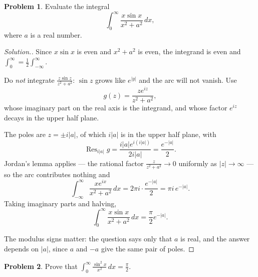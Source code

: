 \documentclass[11pt,a4paper]{article}
\theoremstyle{definition}
\newtheorem{problemx}{Problem}[section]
\newenvironment{problem}{\begin{problemx}}{\end{problemx}}
\newenvironment{solution}
  {\renewcommand{\qedsymbol}{}\begin{proof}[\textit{Solution}.]}
  {\end{proof}}
\begin{document}
\begin{problem}
Evaluate the integral
$$\int^{\infty}_{0}\frac{x \sin x}{x^{2} + a^{2}}\,dx,$$
where $a$ is a real number.
\end{problem}

\begin{solution}
Since $x\sin x$ is even and $x^2+a^2$ is even, the integrand is even and
$\int^{\infty}_{0} = \tfrac12\int^{\infty}_{-\infty}$.

Do \emph{not} integrate $\frac{z\sin z}{z^2+a^2}$: $\sin z$ grows like
$e^{\left|y\right|}$ and the arc will not vanish. Use
$$g(z) = \frac{z e^{iz}}{z^2+a^2},$$
whose imaginary part on the real axis is the integrand, and whose factor $e^{iz}$
decays in the upper half plane.

The poles are $z = \pm i\left|a\right|$, of which $i\left|a\right|$ is in the
upper half plane, with
$$\operatorname{Res}_{i\left|a\right|} g
= \frac{i\left|a\right| e^{i(i\left|a\right|)}}{2i\left|a\right|}
= \frac{e^{-\left|a\right|}}{2}.$$
Jordan's lemma applies --- the rational factor $\frac{z}{z^2+a^2} \rightarrow 0$
uniformly as $\left|z\right| \rightarrow \infty$ --- so the arc contributes
nothing and
$$\int^{\infty}_{-\infty}\frac{x e^{ix}}{x^2+a^2}\,dx
= 2\pi i \cdot \frac{e^{-\left|a\right|}}{2} = \pi i\, e^{-\left|a\right|}.$$
Taking imaginary parts and halving,
$$\boxed{\int^{\infty}_{0}\frac{x\sin x}{x^2+a^2}\,dx
= \frac{\pi}{2}e^{-\left|a\right|}.}$$

The modulus signs matter: the question says only that $a$ is real, and the answer
depends on $\left|a\right|$, since $a$ and $-a$ give the same pair of poles.
\end{solution}


\begin{problem}
Prove that
$\displaystyle\int^{\infty}_{0}\frac{\sin^{2}x}{x^{2}}\,dx = \frac{\pi}{2}$.
\end{problem}
\end{document}
